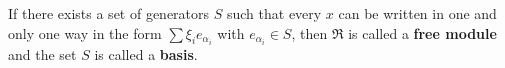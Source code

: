 If there exists a set of generators $S$ such that every $x$ can be written in one and only one way in the form $\sum \xi_i e_{\alpha_i}$ with $e_{\alpha_i} \in S$, then $\mathfrak{R}$ is called a \textbf{free module} and the set $S$ is called a \textbf{basis}.
